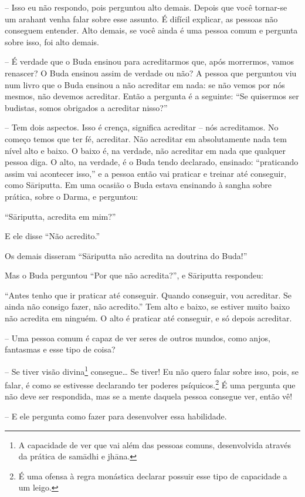 -- Isso eu não respondo, pois perguntou alto demais. Depois que
você tornar-se um arahant venha falar sobre esse assunto. É difícil
explicar, as pessoas não conseguem entender. Alto demais, se você ainda
é uma pessoa comum e pergunta sobre isso, foi alto demais.

-- É verdade que o Buda ensinou para acreditarmos que, após
morrermos, vamos renascer? O Buda ensinou assim de verdade ou não? A
pessoa que perguntou viu num livro que o Buda ensinou a não acreditar
em nada: se não vemos por nós mesmos, não devemos acreditar. Então a
pergunta é a seguinte: “Se quisermos ser budistas, somos obrigados a
acreditar nisso?”

-- Tem dois aspectos. Isso é crença, significa acreditar – nós
acreditamos. No começo temos que ter fé, acreditar. Não acreditar em
absolutamente nada tem nível alto e baixo. O baixo é, na verdade, não
acreditar em nada que qualquer pessoa diga. O alto, na verdade, é o
Buda tendo declarado, ensinado: “praticando assim vai acontecer isso,”
e a pessoa então vai praticar e treinar até conseguir, como
Sāriputta. Em uma ocasião o Buda estava ensinando à sangha sobre
prática, sobre o Darma, e perguntou:

“Sāriputta, acredita em mim?” 

E ele disse “Não acredito.” 

Os demais disseram “Sāriputta não acredita na doutrina do Buda!”

Mas o Buda perguntou “Por que não acredita?”, e Sāriputta
respondeu:

“Antes tenho que ir praticar até conseguir. Quando conseguir, vou
acreditar. Se ainda não consigo fazer, não acredito.” Tem alto e baixo,
se estiver muito baixo não acredita em ninguém. O alto é praticar até
conseguir, e só depois acreditar.

-- Uma pessoa comum é capaz de ver seres de outros mundos, como
anjos, fantasmas e esse tipo de coisa?

-- Se tiver visão divina\footnote{A capacidade de ver que vai além
das pessoas comuns, desenvolvida através da prática de samādhi e
jhāna.} consegue\ldots{} Se tiver! Eu não quero falar sobre isso, pois, se
falar, é como se estivesse declarando ter poderes psíquicos.\footnote{É
uma ofensa à regra monástica declarar possuir esse tipo de capacidade a
um leigo.} É uma pergunta que não deve ser respondida, mas se a mente
daquela pessoa consegue ver, então vê!

-- E ele pergunta como fazer para desenvolver essa habilidade.

